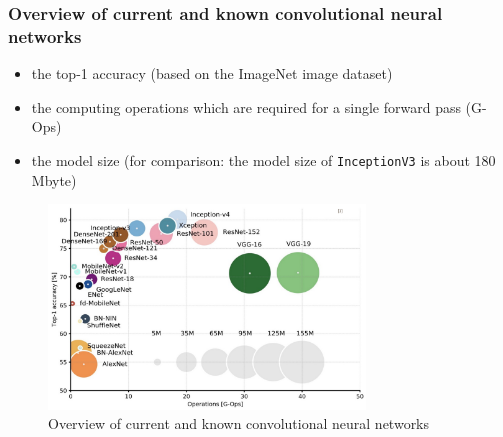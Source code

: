 \documentclass[10pt]{article}
\newif\ifen
\newif\ifde
\newcommand{\en}[1]{\ifen#1\fi}
\newcommand{\de}[1]{\ifde#1\fi}
\begin{document}
				\de{Welchen Vorteil ein vortrainiertes Netzwerk hat, kann man in dieser Arbeit im Kapitel ``\nameref{sec:section_use_of_the_transfer_learning_approach}" einsehen.}
				\en{The advantage of a pre-trained network can be seen in the chapter ``\nameref{sec:section_use_of_the_transfer_learning_approach}" of this thesis.}
			
			\subsubsection{Overview of current and known convolutional neural networks}
				\de{Zu guter Letzt folgen hier noch ein paar aktuelle und bekannte Convolutional Neuronal networks. Sie unterscheiden sich hauptsächlich in folgenden Metriken, wobei in Kombination jedes Netzwerk seine Vor- und Nachteile besitzt:}
				\en{In the following a few current and well-known convolutional neural networks will be presented (Figure \ref{fig:comparison_cnn}). They differ mainly in the following metrics, whereby in combination each network has its advantages and disadvantages:}

				\begin{itemize}
					\setlength\itemsep{0em}
					\item the top-1 accuracy (based on the ImageNet image dataset)
					\item the computing operations which are required for a single forward pass (G-Ops)
					\item the model size (for comparison: the model size of \texttt{InceptionV3} is about 180 Mbyte)
				\end{itemize}
		
				\begin{figure}[H]
					\centering
					\includegraphics[width=0.75\textwidth]{images/tl_models}
					\caption[Overview of current and known convolutional neural networks]{Overview of current and known convolutional neural networks\footnotemark}
					\label{fig:comparison_cnn}
				\end{figure}
\end{document}
